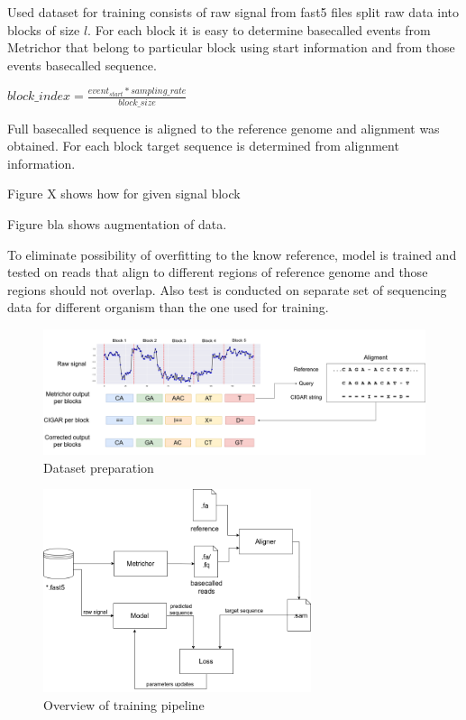 \documentclass[times, utf8, diplomski, numeric, english]{fer}
\begin{document}
Used dataset for training consists of raw signal from fast5 files split raw data into blocks of size $l$.
For each block it is easy to determine basecalled events from Metrichor that belong to particular block using start information and from those events basecalled sequence. 


$block\_index =  \frac{event_{start} * sampling\_rate}{block\_size}$

Full basecalled sequence is aligned to the reference genome and alignment was obtained. For each block target sequence is determined from alignment information.

Figure X shows how for given signal block


Figure bla shows augmentation of data.

To eliminate possibility of overfitting to the know reference, model is trained and tested on reads that align to different regions of reference genome and those regions should not overlap. Also test is conducted on separate set of sequencing data for different organism than the one used for training. 

\begin{figure}[!ht]
	\begin{center}
		\includegraphics[width=1\textwidth]{./imgs/train_data_correction.png}
		\caption{Dataset preparation}
		\label{fg:data_correction}
	\end{center}
\end{figure}
\begin{figure}[!ht]
	\begin{center}
		\includegraphics[width=0.7\textwidth]{./imgs/train_pipeline.png}
		\caption{Overview of training pipeline}
		\label{fg:train_pipe}
	\end{center}
\end{figure}
\end{document}
